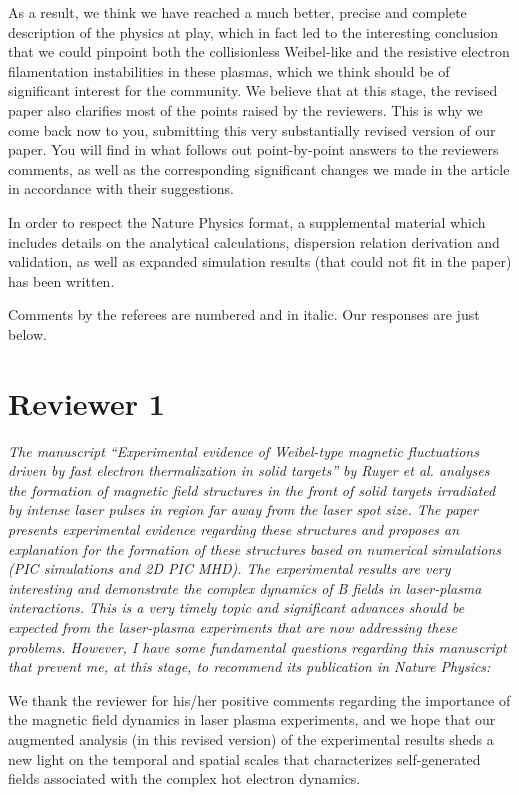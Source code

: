 \documentclass{article}
\begin{document}
As a result, we think we have reached a much better, precise and complete description of the physics at play, which in fact led to the interesting conclusion that we could pinpoint both the  collisionless Weibel-like and the resistive electron filamentation instabilities in these plasmas, which we think should be of significant interest for the community. We believe that at this stage, the revised paper also clarifies most of the points raised by the reviewers. 
This is why we come back now to you, submitting this very substantially revised version of our paper. You will find in what follows out point-by-point answers to the reviewers comments, as well as the corresponding significant changes we made in the article in accordance with their suggestions.

In order to respect the Nature Physics format, a supplemental material which includes details on the analytical calculations, dispersion relation derivation and validation, as well as expanded simulation results (that could not fit in the paper) has been written.

Comments by the referees are numbered and in italic. Our responses are just below.


\section{Reviewer 1 }

\textit{
The manuscript “Experimental evidence of Weibel-type magnetic fluctuations driven by fast electron thermalization in solid targets” by Ruyer et al. analyses the formation of magnetic field structures in the front of solid targets irradiated by intense laser pulses in region far away from the laser spot size. The paper presents experimental evidence regarding these structures and proposes an explanation for the formation of these structures based on numerical simulations (PIC simulations and 2D PIC MHD). The experimental results are very interesting and demonstrate the complex dynamics of B fields in laser-plasma interactions. This is a very timely topic and significant advances should be expected from the laser-plasma experiments that are now addressing these problems.
However, I have some fundamental questions regarding this manuscript that prevent me, at this stage, to recommend its publication in Nature Physics:
}

We thank the reviewer for his/her positive comments regarding  the importance of the magnetic field dynamics in laser plasma experiments, and we hope that our  augmented analysis (in this revised version) of the experimental results sheds a new light on the temporal and spatial scales that characterizes self-generated fields associated with the complex hot electron dynamics.
\end{document}
